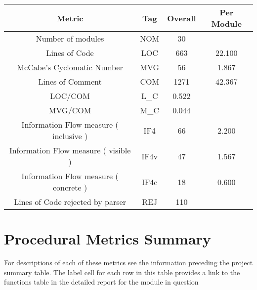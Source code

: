 \begin{tabular}{|c|c|c|c|}
\hline 
Metric &Tag &Overall &Per Module \\
 \hline 
Number of modules &NOM & 30 &  \\
 \hline 
Lines of Code &LOC & 663 &22.100 \\
 \hline 
McCabe's Cyclomatic Number &MVG & 56 & 1.867 \\
 \hline 
Lines of Comment &COM & 1271 &42.367 \\
 \hline 
LOC/COM &L\_C & 0.522 &  \\
 \hline 
MVG/COM &M\_C & 0.044 &  \\
 \hline 
Information Flow measure (  inclusive ) &IF4 & 66 & 2.200 \\
 \hline 
Information Flow measure (  visible ) &IF4v & 47 & 1.567 \\
 \hline 
Information Flow measure (  concrete ) &IF4c & 18 & 0.600 \\
 \hline 
Lines of Code rejected by parser &REJ & 110 &  \\
 \hline 

\end{tabular}

\section{Procedural Metrics Summary}
 For descriptions of each of these metrics see the information preceding the project summary table. The label cell for each row in this
table provides a link to 
the functions table in the detailed report for the module in question 

